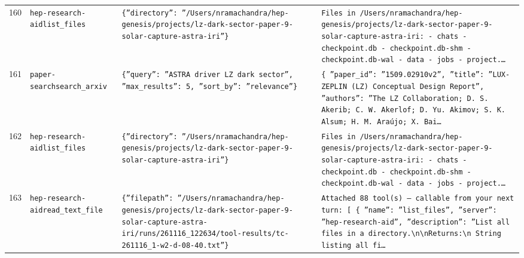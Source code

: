\documentclass[11pt,a4paper]{article}
\begin{document}
\begin{longtable}{@{}p{}p{}p{}p{}@{}}
160 & \texttt{hep-research-aid}\newline\texttt{list\_\allowbreak{}files} & \texttt{\{''directory'':\allowbreak{} ''/\allowbreak{}Users/\allowbreak{}nramachandra/\allowbreak{}hep-genesis/\allowbreak{}projects/\allowbreak{}lz-dark-sector-paper-9-solar-capture-astra-iri''\}\allowbreak{}} & \texttt{Files in /\allowbreak{}Users/\allowbreak{}nramachandra/\allowbreak{}hep-genesis/\allowbreak{}projects/\allowbreak{}lz-dark-sector-paper-9-solar-capture-astra-iri:\allowbreak{}   - chats   - checkpoint.db   - checkpoint.db-shm   - checkpoint.db-wal   - data   - jobs   - project.\ldots{}\allowbreak{}} \\
161 & \texttt{paper-search}\newline\texttt{search\_\allowbreak{}arxiv} & \texttt{\{''query'':\allowbreak{} ''ASTRA driver LZ dark sector'',\allowbreak{} ''max\_\allowbreak{}results'':\allowbreak{} 5,\allowbreak{} ''sort\_\allowbreak{}by'':\allowbreak{} ''relevance''\}\allowbreak{}} & \texttt{\{   ''paper\_\allowbreak{}id'':\allowbreak{} ''1509.02910v2'',\allowbreak{}   ''title'':\allowbreak{} ''LUX-ZEPLIN (LZ)\allowbreak{} Conceptual Design Report'',\allowbreak{}   ''authors'':\allowbreak{} ''The LZ Collaboration;\allowbreak{} D. S. Akerib;\allowbreak{} C. W. Akerlof;\allowbreak{} D. Yu. Akimov;\allowbreak{} S. K. Alsum;\allowbreak{} H. M. Araújo;\allowbreak{} X. Bai\ldots{}\allowbreak{}} \\
162 & \texttt{hep-research-aid}\newline\texttt{list\_\allowbreak{}files} & \texttt{\{''directory'':\allowbreak{} ''/\allowbreak{}Users/\allowbreak{}nramachandra/\allowbreak{}hep-genesis/\allowbreak{}projects/\allowbreak{}lz-dark-sector-paper-9-solar-capture-astra-iri''\}\allowbreak{}} & \texttt{Files in /\allowbreak{}Users/\allowbreak{}nramachandra/\allowbreak{}hep-genesis/\allowbreak{}projects/\allowbreak{}lz-dark-sector-paper-9-solar-capture-astra-iri:\allowbreak{}   - chats   - checkpoint.db   - checkpoint.db-shm   - checkpoint.db-wal   - data   - jobs   - project.\ldots{}\allowbreak{}} \\
163 & \texttt{hep-research-aid}\newline\texttt{read\_\allowbreak{}text\_\allowbreak{}file} & \texttt{\{''filepath'':\allowbreak{} ''/\allowbreak{}Users/\allowbreak{}nramachandra/\allowbreak{}hep-genesis/\allowbreak{}projects/\allowbreak{}lz-dark-sector-paper-9-solar-capture-astra-iri/\allowbreak{}runs/\allowbreak{}261116\_\allowbreak{}122634/\allowbreak{}tool-results/\allowbreak{}tc-261116\_\allowbreak{}1-w2-d-08-40.txt''\}\allowbreak{}} & \texttt{Attached 88 tool(s)\allowbreak{} --- callable from your next turn:\allowbreak{} [  \{   ''name'':\allowbreak{} ''list\_\allowbreak{}files'',\allowbreak{}   ''server'':\allowbreak{} ''hep-research-aid'',\allowbreak{}   ''description'':\allowbreak{} ''List all files in a directory.\textbackslash{}\allowbreak{}n\textbackslash{}\allowbreak{}nReturns:\allowbreak{}\textbackslash{}\allowbreak{}n    String listing all fi\ldots{}\allowbreak{}} \\

\end{longtable}
\end{document}
